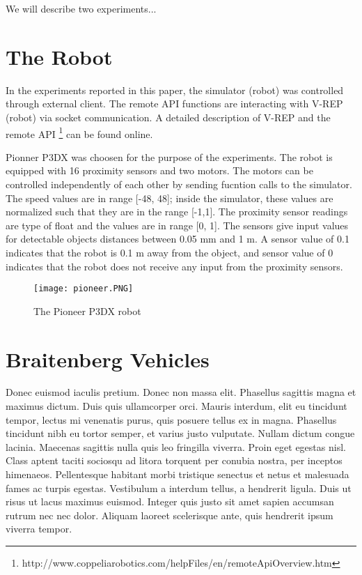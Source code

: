 \documentclass[format=acmsmall, review=false, screen=true]{acmart}
\begin{document}
We will describe two experiments...


\section{The Robot}

In the experiments reported in this paper, the simulator (robot) was controlled through external client. The remote API functions are interacting with V-REP (robot) via socket communication. A detailed description of V-REP and the remote API \footnote{http://www.coppeliarobotics.com/helpFiles/en/remoteApiOverview.htm} can be found online.

Pionner P3DX was choosen for the purpose of the experiments. The robot is equipped with 16 proximity sensors and two motors. The motors can be controlled independently of each other by sending fucntion calls to the simulator. The speed values are in range [-48, 48]; inside the simulator, these values are normalized such that they are in the range [-1,1]. The proximity sensor readings are type of float and the values are in range [0, 1]. The sensors give input values for detectable objects distances between 0.05 mm and 1 m. A sensor value of 0.1 indicates that the robot is 0.1 m away from the object, and sensor value of 0 indicates that the robot does not receive any input from the proximity sensors.

\begin{figure}[H]
  \texttt{[image: pioneer.PNG]}
  \caption{The Pioneer P3DX robot}
  \label{fig:pioneer-robot}
\end{figure}

\section{Braitenberg Vehicles}

Donec euismod iaculis pretium. Donec non massa elit. Phasellus sagittis magna et maximus dictum. Duis quis ullamcorper orci. Mauris interdum, elit eu tincidunt tempor, lectus mi venenatis purus, quis posuere tellus ex in magna. Phasellus tincidunt nibh eu tortor semper, et varius justo vulputate. Nullam dictum congue lacinia. Maecenas sagittis nulla quis leo fringilla viverra. Proin eget egestas nisl. Class aptent taciti sociosqu ad litora torquent per conubia nostra, per inceptos himenaeos. Pellentesque habitant morbi tristique senectus et netus et malesuada fames ac turpis egestas. Vestibulum a interdum tellus, a hendrerit ligula. Duis ut risus ut lacus maximus euismod. Integer quis justo sit amet sapien accumsan rutrum nec nec dolor. Aliquam laoreet scelerisque ante, quis hendrerit ipsum viverra tempor.
\end{document}
